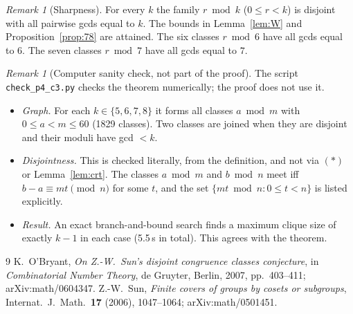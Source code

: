 \documentclass[11pt]{article}
\theoremstyle{remark}
\newtheorem{remark}[theorem]{Remark}
\theoremstyle{definition}
\begin{document}
\begin{remark}[Sharpness]
For every $k$ the family $r\bmod k$ ($0\le r<k$) is disjoint with all pairwise gcds equal to
$k$. The bounds in Lemma~\ref{lem:W} and Proposition~\ref{prop:78} are attained. The six classes
$r\bmod6$ have all gcds equal to $6$. The seven classes $r\bmod7$ have all gcds equal to $7$.
\end{remark}

\begin{remark}[Computer sanity check, not part of the proof]
The script \texttt{check\_p4\_c3.py} checks the theorem numerically; the proof does not use it.
\begin{itemize}
\item \emph{Graph.} For each $k\in\{5,6,7,8\}$ it forms all classes $a\bmod m$ with $0\le a<m\le60$
  (1829 classes). Two classes are joined when they are disjoint and their moduli have gcd $<k$.
\item \emph{Disjointness.} This is checked literally, from the definition, and not via $(*)$ or
  Lemma~\ref{lem:crt}. The classes $a\bmod m$ and $b\bmod n$ meet iff $b-a\equiv mt\pmod n$ for some
  $t$, and the set $\{mt\bmod n:0\le t<n\}$ is listed explicitly.
\item \emph{Result.} An exact branch-and-bound search finds a maximum clique size of exactly $k-1$
  in each case (5.5\,s in total). This agrees with the theorem.
\end{itemize}
\end{remark}

\begin{thebibliography}{9}
 K.~O'Bryant, \emph{On Z.-W.\ Sun's disjoint congruence classes conjecture}, in
  \emph{Combinatorial Number Theory}, de Gruyter, Berlin, 2007, pp.~403--411; arXiv:math/0604347.
 Z.-W.~Sun, \emph{Finite covers of groups by cosets or subgroups}, Internat.\ J.\ Math.\
  \textbf{17} (2006), 1047--1064; arXiv:math/0501451.
\end{thebibliography}
\end{document}
